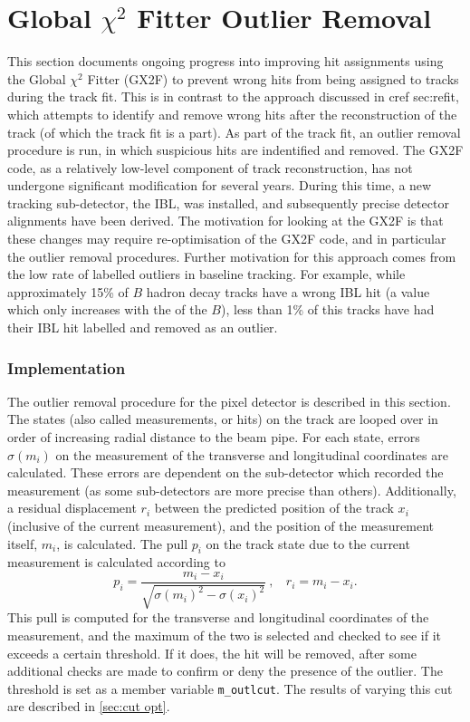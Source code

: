 \section{Global \texorpdfstring{$\chi^2$}{chi2} Fitter Outlier Removal}\label{sec:gx2f outlier removal}

This section documents ongoing progress into improving hit assignments using the Global $\chi^2$ Fitter (GX2F) to prevent wrong hits from being assigned to tracks during the track fit. This is in contrast to the approach discussed in  cref sec:refit, which attempts to identify and remove wrong hits after the reconstruction of the track (of which the track fit is a part). As part of the track fit, an outlier removal procedure is run, in which suspicious hits are indentified and removed. The GX2F code, as a relatively low-level component of track reconstruction, has not undergone significant modification for several years. During this time, a new tracking sub-detector, the IBL, was installed, and subsequently precise detector alignments have been derived. The motivation for looking at the GX2F is that these changes may require re-optimisation of the GX2F code, and in particular the outlier removal procedures. Further motivation for this approach comes from the low rate of labelled outliers in baseline tracking. For example, while approximately 15\% of $B$ hadron decay tracks have a wrong IBL hit (a value which only increases with the \pT of the $B$), less than 1\% of this tracks have had their IBL hit labelled and removed as an outlier.

\subsubsection{Implementation}
The outlier removal procedure for the pixel detector is described in this section. The states (also called measurements, or hits) on the track are looped over in order of increasing radial distance to the beam pipe. For each state, errors $\sigma(m_i)$ on the measurement of the transverse and longitudinal coordinates are calculated. These errors are dependent on the sub-detector which recorded the measurement (as some sub-detectors are more precise than others). Additionally, a residual displacement $r_i$ between the predicted position of the track $x_i$ (inclusive of the current measurement), and the position of the measurement itself, $m_i$, is calculated. The pull $p_i$ on the track state due to the current measurement is calculated according to
%
\begin{equation}
    p_i = \frac{m_i - x_i}{\sqrt{\sigma(m_i)^2 - \sigma(x_i)^2}}
    ~,~~~~ 
    r_i = m_i - x_i  .
\end{equation}
%
This pull is computed for the transverse and longitudinal coordinates of the measurement, and the maximum of the two is selected and checked to see if it exceeds a certain threshold. If it does, the hit will be removed, after some additional checks are made to confirm or deny the presence of the outlier. The threshold is set as a member variable \texttt{m\_outlcut}. The results of varying this cut are described in \cref{sec:cut opt}.


